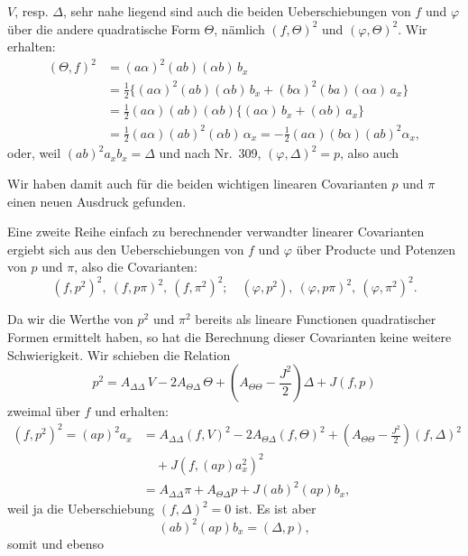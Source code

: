 $V$, resp. $\Delta$, sehr nahe liegend sind auch die beiden Ueberschiebungen
von $f$ und $\varphi$ über die andere quadratische Form $\Theta$, nämlich
$(f, \Theta)^2$ und $(\varphi, \Theta)^2$. Wir erhalten:
\[
\begin{aligned}
(\Theta, f)^2 &= (a\alpha)^2(ab)(\alpha b)\,b_x\\
&= \frac{1}{2}\{(a\alpha)^2(ab)(\alpha b)\,b_x + (b\alpha)^2(ba)(\alpha a)\,a_x\}\\
&= \frac{1}{2}(a\alpha)(ab)(\alpha b)\{(a\alpha)\,b_x + (\alpha b)\,a_x\}\\
&= \frac{1}{2}(a\alpha)(ab)^2(\alpha b)\,\alpha_x = -\frac{1}{2}(a\alpha)(b\alpha)(ab)^2\alpha_x,
\end{aligned}
\]
oder, weil $(ab)^2a_xb_x = \Delta$ und nach Nr.\ 309, $(\varphi, \Delta)^2 = p$,
also auch

Wir haben damit auch für die beiden wichtigen linearen Covarianten $p$ und
$\pi$ einen neuen Ausdruck gefunden.

Eine zweite Reihe einfach zu berechnender verwandter linearer Covarianten
ergiebt sich aus den Ueberschiebungen von $f$ und $\varphi$ über Producte
und Potenzen von $p$ und $\pi$, also die Covarianten:
\[
(f, p^2)^2, \ (f, p\pi)^2, \ (f, \pi^2)^2; \quad (\varphi, p^2), \ (\varphi, p\pi)^2, \ (\varphi, \pi^2)^2. %
\]

Da wir die Werthe von $p^2$ und $\pi^2$ bereits als lineare Functionen
quadratischer Formen ermittelt haben, so hat die Berechnung dieser
Covarianten keine weitere Schwierigkeit. Wir schieben die Relation
\[
p^2 = A_{\Delta\Delta}\,V - 2A_{\Theta\Delta}\,\Theta + \left(A_{\Theta\Theta} - \frac{J^2}{2}\right)\Delta + J(f, p)
\]
zweimal über $f$ und erhalten:
\[
\begin{aligned}
(f, p^2)^2 = (ap)^2a_x &= A_{\Delta\Delta}(f,V)^2 - 2A_{\Theta\Delta}(f,\Theta)^2 + \left(A_{\Theta\Theta} - \frac{J^2}{2}\right)(f,\Delta)^2\\
&\quad + J(f, (ap)a_x^2)^2\\
&= A_{\Delta\Delta}\pi + A_{\Theta\Delta}p + J(ab)^2(ap)b_x,
\end{aligned}
\]
weil ja die Ueberschiebung $(f, \Delta)^2 = 0$ ist. Es ist aber
\[
(ab)^2(ap)b_x = (\Delta, p),
\]
somit
und ebenso

